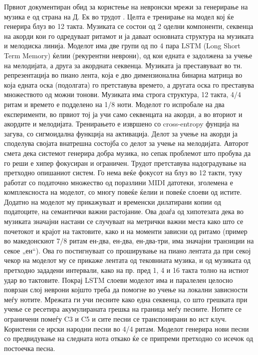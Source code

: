 Првиот документиран обид за користење на невронски мрежи за генерирање на музика е од страна на Д. Ек во трудот \cite{Eck2002}. Целта е тренирање на модел кој ќе генерира блуз во 12 такта. Музиката се состои од 2 оделни компоненти, секвенца на акорди кои го одредуваат ритамот и ја даваат основната структура на музиката и мелодиска линија. Моделот има две групи од по 4 пара LSTM (Long Short Term Memory) ќелии (рекурентни неврони), од кои едната е задолжена за учење на мелодијата, а друга за акордната секвенца. Музиката ја преставуваат во тн. репрезентација во пиано лента, која е дво димензионална бинарна матрица во која едната оска (подолгата) го претставува времето, а другата оска го преставува множеството од можни тонови. Музиката има строга структура, 12 такта, 4/4 ритам и времето е подделено на 1/8 ноти. Моделот го испробале на два експерименти, во првиот тој ја учи само секвенцата на акорди, а во вториот и акордите и мелодијата. Тренирањето е извршено со cross-entropy фунција на загува, со сигмоидална функција на активација. Делот за учење на акорди ја споделува својата внатрешна состојба со делот за учење на мелодијата. Авторот смета дека системот генерира добра музика, но сепак проблемот што пробува да го реши е хипер фокусиран и ограничен. Трудот \cite{Eck2008} претставува надоградување на претходно опишаниот систем. Го нема веќе фокусот на блуз во 12 такти, туку работат со податочно множество од поразлини MIDI датотеки, зголемена е комплексноста на моделот, со многу повеќе ќелии и повеќе слоеви од истите. Додатно на моделот му прикажуваат и временски дилатирани копии од податоците, на семантички важни растојание. Ова доаѓа од хипотезата дека во музиката значајни настани се случуваат на метрички важни места како што се почетокот и крајот на тактовите, како и на моменти зависни од ритамо (пример во македонскиот 7/8 ритам ен-два, ен-два, ен-два-три, има значајни транзиции на секое „ен“). Ова го постигнуваат со проширување на пиано лентата да при секој чекор на моделот му се прикаже лентата од тековниата музика, и од музиката од претходно зададени интервали, како на пр. пред 1, 4 и 16 такта толно на истиот удар во тактовите. Покрај LSTM слоеви моделот има и паралелен целосно поврзан слој неврони којшто треба да помогне во учење на локални зависности меѓу нотите. Мрежата ги учи песните како една секвенца, со што грешката при учење се ресетира акумулираната грешка на граница меѓу песните. Нотите се ограничени помеѓу C3 и C5 и сите песни се транспонирани во ист клуч. Користени се ирски народни песни во 4/4 ритам. Моделот генерира нови песни со предвидување на следната нота откако ќе се припреми претходно со исечок од постоечка песна.

